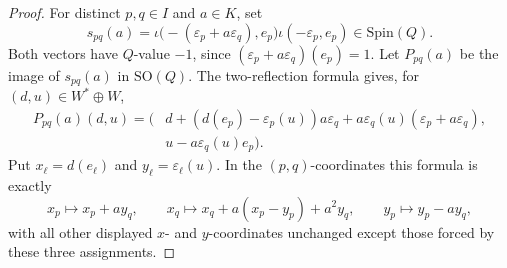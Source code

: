 \documentclass{birkjour}
\theoremstyle{plain}
\theoremstyle{definition}
\theoremstyle{remark}
\numberwithin{equation}{section}
\newcommand{\Spin}{\mathrm{Spin}}
\newcommand{\SO}{\mathrm{SO}}
\begin{document}
\begin{proof}
For distinct \(p,q\in I\) and \(a\in K\), set
\[
  s_{pq}(a)=
    \iota\bigl(-(\varepsilon_p+a\varepsilon_q),e_p\bigr)
    \iota(-\varepsilon_p,e_p)\in \Spin(Q).
\]
Both vectors have \(Q\)-value \(-1\), since
\((\varepsilon_p+a\varepsilon_q)(e_p)=1\). Let \(P_{pq}(a)\) be the image of
\(s_{pq}(a)\) in \(\SO(Q)\). The two-reflection formula gives, for
\((d,u)\in W^*\oplus W\),
\[
\begin{aligned}
P_{pq}(a)(d,u)=
\bigl(&d+(d(e_p)-\varepsilon_p(u))a\varepsilon_q
        +a\varepsilon_q(u)(\varepsilon_p+a\varepsilon_q),\\
      &u-a\varepsilon_q(u)e_p\bigr).
\end{aligned}
\]
Put \(x_\ell=d(e_\ell)\) and \(y_\ell=\varepsilon_\ell(u)\). In the
\((p,q)\)-coordinates this formula is exactly
\[
  x_p\mapsto x_p+a y_q,\qquad
  x_q\mapsto x_q+a(x_p-y_p)+a^2y_q,\qquad
  y_p\mapsto y_p-a y_q,
\]
with all other displayed \(x\)- and \(y\)-coordinates unchanged except those
forced by these three assignments.


\end{proof}
\end{document}
